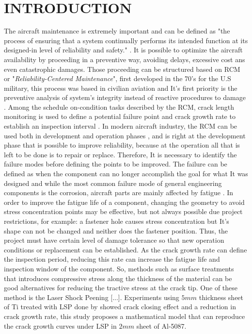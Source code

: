 \section{\MakeUppercase{Introduction}}
The aircraft maintenance is extremely important and can be defined as "the process of ensuring that a system continually performs its intended function at its designed-in level of reliability and safety." \textcite[p. 35]{kinnison2013aviation}. It is possible to optimize the aircraft availability by proceeding in a preventive way, avoiding delays, excessive cost ans even catastrophic damages. Those proceeding can be structured based on RCM or "\textit{Reliability-Centered Maintenance}", first developed in the 70's for the U.S military, this process was based in civilian aviation and It's first priority is the preventive analysis of system's integrity instead of reactive procedures to damage \cite[p. 34]{kinnison2013aviation}. Among the schedule on-condition tasks  described by the RCM, crack length monitoring is used to define a potential failure point and crack growth rate to establish an inspection interval \cite[p. 52]{nowlan1978maintenance}. In modern aircraft industry, the RCM can be used both in development and operation phases \cite{ludek2005rcm}, and is right at the development phase that is possible to improve reliability, because at the operation all that is left to be done is to repair or replace. Therefore, It is necessary to identify the failure modes before defining the points to be improved. The failure can be defined as when the component can no longer accomplish the goal for what It was designed \cite{findlay2002aircraft} and while the most common failure mode of general engineering components is the corrosion, aircraft parts are mainly affected by fatigue \cite{tavares2017overview}. In order to improve the fatigue life of a component, changing the geometry to avoid stress concentration points may be effective, but not always possible due project restrictions, for example: a fastener hole causes stress concentration but It's shape can not be changed and neither does the fastener position. Thus, the project must have certain level of damage tolerance so that new operation conditions or replacement can be established. As the crack growth rate can define the inspection period, reducing this rate can increase the fatigue life and inspection window of the component. So, methods such as surface treatments that introduces compressive stress along the thickness of the material can be good alternatives for reducing the tractive stress at the crack tip. One of these method is the  Laser Shock Peening [...]. Experiments using $5 mm$ thickness sheet of Ti treated with LSP done by \textcite{SUN2021106081} showed crack closing effect and a reduction in crack growth rate, this study proposes a mathematical model that can reproduce the crack growth curves under LSP in $2 mm$ sheet of Al-5087.
